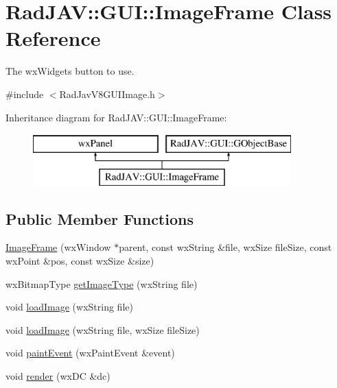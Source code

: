 \hypertarget{class_rad_j_a_v_1_1_g_u_i_1_1_image_frame}{}\section{Rad\+J\+AV\+:\+:G\+UI\+:\+:Image\+Frame Class Reference}
\label{class_rad_j_a_v_1_1_g_u_i_1_1_image_frame}


The wx\+Widgets button to use.  




{\ttfamily \#include $<$Rad\+Jav\+V8\+G\+U\+I\+Image.\+h$>$}

Inheritance diagram for Rad\+J\+AV\+:\+:G\+UI\+:\+:Image\+Frame\+:\begin{figure}[H]
\begin{center}
\leavevmode
\includegraphics[height=2.000000cm]{class_rad_j_a_v_1_1_g_u_i_1_1_image_frame}
\end{center}
\end{figure}
\subsection*{Public Member Functions}
\begin{DoxyCompactItemize}
\item 
\mbox{\hyperlink{class_rad_j_a_v_1_1_g_u_i_1_1_image_frame_af019c33222b11c3e24b378c458d3284c}{Image\+Frame}} (wx\+Window $\ast$parent, const wx\+String \&file, wx\+Size file\+Size, const wx\+Point \&pos, const wx\+Size \&size)
\item 
wx\+Bitmap\+Type \mbox{\hyperlink{class_rad_j_a_v_1_1_g_u_i_1_1_image_frame_a5f164064f4f2b934e5c6fff6d721e1c6}{get\+Image\+Type}} (wx\+String file)
\item 
void \mbox{\hyperlink{class_rad_j_a_v_1_1_g_u_i_1_1_image_frame_a2150f003e5ba706ed7776b0bc153e4af}{load\+Image}} (wx\+String file)
\item 
void \mbox{\hyperlink{class_rad_j_a_v_1_1_g_u_i_1_1_image_frame_a5041a16da0c36e9897e5d562a5a6df33}{load\+Image}} (wx\+String file, wx\+Size file\+Size)
\item 
void \mbox{\hyperlink{class_rad_j_a_v_1_1_g_u_i_1_1_image_frame_acb93685cdbe322de44d9e57863e546f3}{paint\+Event}} (wx\+Paint\+Event \&event)
\item 
void \mbox{\hyperlink{class_rad_j_a_v_1_1_g_u_i_1_1_image_frame_a0dbeca97ef02fbdc16e82b1eff66e108}{render}} (wx\+DC \&dc)
\end{DoxyCompactItemize}

